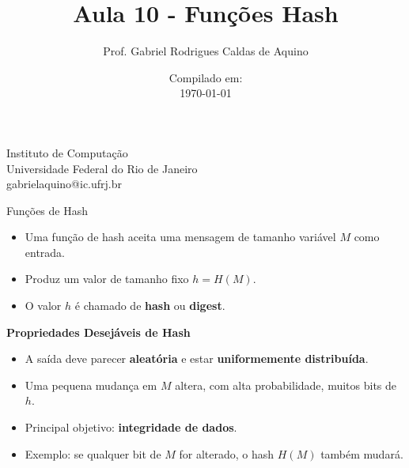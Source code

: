 \title{Aula 10 - Funções Hash}

\author{Prof. Gabriel Rodrigues Caldas de Aquino}

\institute
{
    Instituto de Computação \\
    Universidade Federal do Rio de Janeiro\\
    gabrielaquino@ic.ufrj.br%
}
\date{Compilado em: \\ \today} %




\begin{frame}
    \titlepage
\end{frame}

\begin{frame}{Funções de Hash}
    \begin{itemize}
        \item Uma função de hash aceita uma mensagem de tamanho variável $M$ como entrada.
        \item Produz um valor de tamanho fixo $h = H(M)$.
        \item O valor $h$ é chamado de \textbf{hash} ou \textbf{digest}.
    \end{itemize}
    \textbf{Propriedades Desejáveis de Hash}
    \begin{itemize}
        \item A saída deve parecer \textbf{aleatória} e estar \textbf{uniformemente distribuída}.
        \item Uma pequena mudança em $M$ altera, com alta probabilidade, muitos bits de $h$.
        \item Principal objetivo: \textbf{integridade de dados}.
        \item Exemplo: se qualquer bit de $M$ for alterado, o hash $H(M)$ também mudará.
    \end{itemize}
\end{frame}

